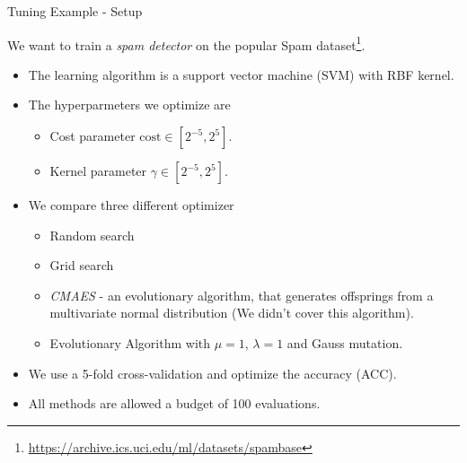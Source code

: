 \begin{frame}{Tuning Example - Setup}

    We want to train a \textit{spam detector} on the popular Spam dataset\footnote{\url{https://archive.ics.uci.edu/ml/datasets/spambase}}.

    \begin{itemize}
        \item The learning algorithm is a support vector machine (SVM) with RBF kernel.
        \item The hyperparmeters we optimize are
            \begin{itemize}
                \item Cost parameter $\text{cost} \in [2^{-5}, 2^5]$.
                \item Kernel parameter $\gamma \in [2^{-5}, 2^5]$.
            \end{itemize}
        \item We compare three different optimizer
            \begin{itemize}
                \item Random search
                \item Grid search
                \item \textit{CMAES} - an evolutionary algorithm, that generates offsprings from a multivariate normal distribution (We didn't cover this algorithm).
                \item Evolutionary Algorithm with $\mu = 1$, $\lambda = 1$ and Gauss mutation.
            \end{itemize}
        \item We use a 5-fold cross-validation and optimize the accuracy (ACC).
        \item All methods are allowed a budget of 100 evaluations.
    \end{itemize}

\end{frame}

